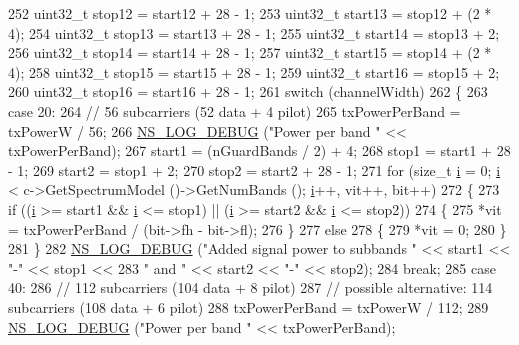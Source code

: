 \begin{DoxyCode}
252   uint32\_t stop12 = start12 + 28 - 1;
253   uint32\_t start13 = stop12 + (2 * 4);
254   uint32\_t stop13 = start13 + 28 - 1;
255   uint32\_t start14 = stop13 + 2;
256   uint32\_t stop14 = start14 + 28 - 1;
257   uint32\_t start15 = stop14 + (2 * 4);
258   uint32\_t stop15 = start15 + 28 - 1;
259   uint32\_t start16 = stop15 + 2;
260   uint32\_t stop16 = start16 + 28 - 1;
261   \textcolor{keywordflow}{switch} (channelWidth)
262     \{
263     \textcolor{keywordflow}{case} 20:
264       \textcolor{comment}{// 56 subcarriers (52 data + 4 pilot)}
265       txPowerPerBand = txPowerW / 56;
266       \hyperlink{group__logging_ga413f1886406d49f59a6a0a89b77b4d0a}{NS\_LOG\_DEBUG} (\textcolor{stringliteral}{"Power per band "} << txPowerPerBand);
267       start1 = (nGuardBands / 2) + 4;
268       stop1 = start1 + 28 - 1;
269       start2 = stop1 + 2;
270       stop2 = start2 + 28 - 1;
271       \textcolor{keywordflow}{for} (\textcolor{keywordtype}{size\_t} \hyperlink{bernuolliDistribution_8m_a6f6ccfcf58b31cb6412107d9d5281426}{i} = 0; \hyperlink{bernuolliDistribution_8m_a6f6ccfcf58b31cb6412107d9d5281426}{i} < c->GetSpectrumModel ()->GetNumBands (); \hyperlink{bernuolliDistribution_8m_a6f6ccfcf58b31cb6412107d9d5281426}{i}++, vit++, bit++)
272         \{
273           \textcolor{keywordflow}{if} ((\hyperlink{bernuolliDistribution_8m_a6f6ccfcf58b31cb6412107d9d5281426}{i} >= start1 && \hyperlink{bernuolliDistribution_8m_a6f6ccfcf58b31cb6412107d9d5281426}{i} <= stop1) || (\hyperlink{bernuolliDistribution_8m_a6f6ccfcf58b31cb6412107d9d5281426}{i} >= start2 && \hyperlink{bernuolliDistribution_8m_a6f6ccfcf58b31cb6412107d9d5281426}{i} <= stop2))
274             \{
275               *vit = txPowerPerBand / (bit->fh - bit->fl);
276             \}
277           \textcolor{keywordflow}{else}
278             \{
279               *vit = 0;
280             \}
281         \}
282       \hyperlink{group__logging_ga413f1886406d49f59a6a0a89b77b4d0a}{NS\_LOG\_DEBUG} (\textcolor{stringliteral}{"Added signal power to subbands "} << start1 << \textcolor{stringliteral}{"-"} << stop1 <<
283                     \textcolor{stringliteral}{" and "} << start2 << \textcolor{stringliteral}{"-"} << stop2);
284       \textcolor{keywordflow}{break};
285     \textcolor{keywordflow}{case} 40:
286       \textcolor{comment}{// 112 subcarriers (104 data + 8 pilot) }
287       \textcolor{comment}{// possible alternative:  114 subcarriers (108 data + 6 pilot)}
288       txPowerPerBand = txPowerW / 112;
289       \hyperlink{group__logging_ga413f1886406d49f59a6a0a89b77b4d0a}{NS\_LOG\_DEBUG} (\textcolor{stringliteral}{"Power per band "} << txPowerPerBand);

\end{DoxyCode}
